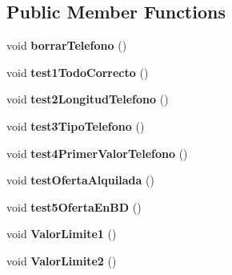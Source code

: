 \subsection*{Public Member Functions}
\begin{DoxyCompactItemize}
\item 
\mbox{\label{class_testing_1_1_test_create_book_a22b7be219ee185ba9d0c8c8d1703ba7a}} 
void {\bfseries borrar\+Telefono} ()
\item 
\mbox{\label{class_testing_1_1_test_create_book_ab4204dc3d4f266e549f33c7124c62863}} 
void {\bfseries test1\+Todo\+Correcto} ()
\item 
\mbox{\label{class_testing_1_1_test_create_book_a6369c3d0cf18dbb44ddec578fc74751e}} 
void {\bfseries test2\+Longitud\+Telefono} ()
\item 
\mbox{\label{class_testing_1_1_test_create_book_a8ebd6d3cb28a0eb97216a50978700aad}} 
void {\bfseries test3\+Tipo\+Telefono} ()
\item 
\mbox{\label{class_testing_1_1_test_create_book_a54787ef66ad57d68e99ed5b067342f64}} 
void {\bfseries test4\+Primer\+Valor\+Telefono} ()
\item 
\mbox{\label{class_testing_1_1_test_create_book_aadb64058f69cefdef24ffab6d7ec76c8}} 
void {\bfseries test\+Oferta\+Alquilada} ()
\item 
\mbox{\label{class_testing_1_1_test_create_book_a8916ec26282dd0821b6740cfbb4b43ac}} 
void {\bfseries test5\+Oferta\+En\+BD} ()
\item 
\mbox{\label{class_testing_1_1_test_create_book_a198ebafb70f3e7233b7a050fdc6660c4}} 
void {\bfseries Valor\+Limite1} ()
\item 
\mbox{\label{class_testing_1_1_test_create_book_a996c87c88057d6cc52aff7c69467a77f}} 
void {\bfseries Valor\+Limite2} ()
\item 

\end{DoxyCompactItemize}
